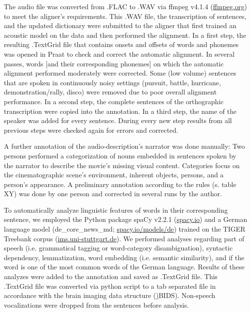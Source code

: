 \documentclass[10pt,a4paper,twocolumn]{article}
\begin{document}
The audio file was converted from .FLAC to .WAV via ffmpeg v4.1.4
(\href{www.ffmpeg.org}{ffmpeg.org}) to meet the aligner's requirements. This
.WAV file, the transcription of sentences, and the updated dictionary were
submitted to the aligner that first trained an acoustic model on the data and
then performed the alignment. In a first step, the resulting .TextGrid file that
contains onsets and offsets of words and phonemes was opened in Praat to check
and correct the automatic alignment. In several passes, words [and their
corresponding phonemes] on which the automatic alignment performed moderately
were corrected. Some (low volume) sentences that are spoken in continuously
noisy settings (pursuit, battle, hurricane, demonstration/rally, disco) were
removed due to poor overall alignment performance. In a second step, the
complete sentences of the orthographic transcription were copied into the
annotation. In a third step, the name of the speaker was added for every sentence.
During every new step results from all previous steps were checked again for errors and corrected.

A further annotation of the audio-description's narrator was done manually: Two
persons performed a categorization of nouns embedded in sentences spoken by the
narrator to describe the movie's missing visual content. Categories focus on the
cinematographic scene's environment, inherent objects, persons, and a person's
appearance. A preliminary annotation according to the rules (s. table XY) was done by one person and corrected in several runs by the author.

To automatically analyze linguistic features of words in their corresponding
sentence, we employed the Python package spaCy v2.2.1
(\href{https://spacy.io}{spacy.io}) and a German language model
(de\_core\_news\_md; \href{https://spacy.io/models/de}{spacy.io/models/de})
trained on the TIGER Treebank corpus
(\href{https://www.ims.uni-stuttgart.de}{ims.uni-stuttgart.de}). We performed
analyses regarding part of speech (i.e. grammatical tagging or word-category
disambiguation), syntactic dependency, lemmatization, word embedding (i.e.
semantic similarity), and if the word is one of the most common words of the
German language. Results of these analyzes were added to the annotation and
saved as .TextGrid file. This .TextGrid file was converted via python script to
a tab separated file in accordance with the brain imaging data structure
(\href{https://bids.neuroimaging.io/}){BIDS}\citep{gorgolewski2016bids}). Non-speech vocalizations were dropped from the sentences before analysis.
\end{document}
